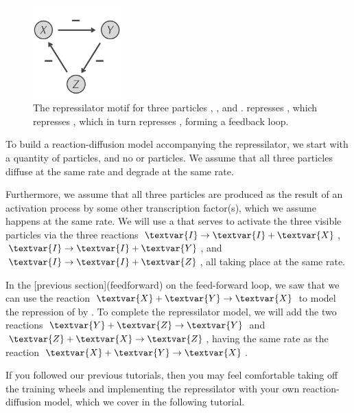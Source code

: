 \begin{figure}[h]
\centering
\mySfFamily
\includegraphics[width = 0.3\textwidth]{../images/repressilator.png}
\caption{The repressilator motif for three particles , , and .  represses , which represses , which in turn represses , forming a feedback loop.}
\label{fig:repressilator}
\end{figure}

\begin{qbox}\end{qbox}

To build a reaction-diffusion model accompanying the repressilator, we start with a quantity of  particles, and no  or  particles. We assume that all three particles diffuse at the same rate and degrade at the same rate.

Furthermore, we assume that all three particles are produced as the result of an activation process by some other transcription factor(s), which we assume happens at the same rate. We will use a   that serves to activate the three visible particles via the three reactions $\textvar{I} \rightarrow \textvar{I} + \textvar{X}$, $\textvar{I} \rightarrow \textvar{I} + \textvar{Y}$, and $\textvar{I} \rightarrow \textvar{I} + \textvar{Z}$, all taking place at the same rate.

In the [previous section](feedforward) on the feed-forward loop, we saw that we can use the reaction $\textvar{X} + \textvar{Y} \rightarrow \textvar{X}$ to model the repression of  by . To complete the repressilator model, we will add the two reactions $\textvar{Y} + \textvar{Z} \rightarrow \textvar{Y}$ and $\textvar{Z} + \textvar{X} \rightarrow \textvar{Z}$, having the same rate as the reaction $\textvar{X} + \textvar{Y} \rightarrow \textvar{X}$.

If you followed our previous tutorials, then you may feel comfortable taking off the training wheels and implementing the repressilator with your own reaction-diffusion model, which we cover in the following tutorial.

